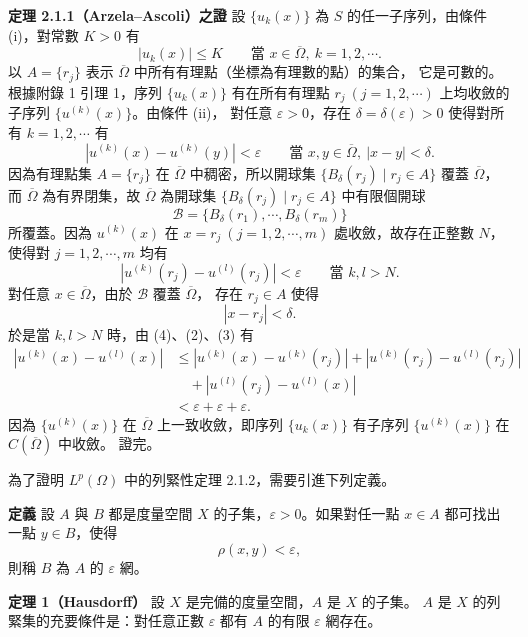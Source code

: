 \documentclass[11pt,a4paper,twoside]{article}
\begin{document}
\noindent\textbf{定理 2.1.1（Arzela--Ascoli）之證}\quad
設 $\{u_k(x)\}$ 為 $S$ 的任一子序列，由條件 (i)，對常數 $K>0$ 有
\[
    |u_k(x)|\le K
    \qquad
    \text{當 }x\in\overline{\Omega},\ k=1,2,\cdots .
    \tag{1}
\]
以 $A=\{r_j\}$ 表示 $\overline{\Omega}$ 中所有有理點（坐標為有理數的點）的集合，
它是可數的。根據附錄 1 引理 1，序列 $\{u_k(x)\}$ 有在所有有理點
$r_j\ (j=1,2,\cdots)$ 上均收斂的子序列 $\{u^{(k)}(x)\}$。由條件 (ii)，
對任意 $\varepsilon>0$，存在 $\delta=\delta(\varepsilon)>0$ 使得對所有
$k=1,2,\cdots$ 有
\[
    |u^{(k)}(x)-u^{(k)}(y)|<\varepsilon
    \qquad
    \text{當 }x,y\in\overline{\Omega},\ |x-y|<\delta .
    \tag{2}
\]
因為有理點集 $A=\{r_j\}$ 在 $\overline{\Omega}$ 中稠密，所以開球集
$\{B_\delta(r_j)\mid r_j\in A\}$ 覆蓋 $\overline{\Omega}$，而
$\overline{\Omega}$ 為有界閉集，故 $\overline{\Omega}$ 為開球集
$\{B_\delta(r_j)\mid r_j\in A\}$ 中有限個開球
\[
    \mathscr{B}=\{B_\delta(r_1),\cdots,B_\delta(r_m)\}
\]
所覆蓋。因為 $u^{(k)}(x)$ 在 $x=r_j\ (j=1,2,\cdots,m)$ 處收斂，故存在正整數
$N$，使得對 $j=1,2,\cdots,m$ 均有
\[
    |u^{(k)}(r_j)-u^{(l)}(r_j)|<\varepsilon
    \qquad
    \text{當 }k,l>N.
    \tag{3}
\]
對任意 $x\in\overline{\Omega}$，由於 $\mathscr{B}$ 覆蓋 $\overline{\Omega}$，
存在 $r_j\in A$ 使得
\[
    |x-r_j|<\delta .
    \tag{4}
\]
於是當 $k,l>N$ 時，由 (4)、(2)、(3) 有
\[
    \begin{aligned}
        |u^{(k)}(x)-u^{(l)}(x)|
         & \le
        |u^{(k)}(x)-u^{(k)}(r_j)|
        +
        |u^{(k)}(r_j)-u^{(l)}(r_j)|              \\
         & \quad+
        |u^{(l)}(r_j)-u^{(l)}(x)|                \\
         & <\varepsilon+\varepsilon+\varepsilon.
    \end{aligned}
\]
因為 $\{u^{(k)}(x)\}$ 在 $\overline{\Omega}$ 上一致收斂，即序列
$\{u_k(x)\}$ 有子序列 $\{u^{(k)}(x)\}$ 在 $C(\overline{\Omega})$ 中收斂。
證完。

\newpage

為了證明 $L^p(\Omega)$ 中的列緊性定理 2.1.2，需要引進下列定義。

\noindent\textbf{定義}\quad
設 $A$ 與 $B$ 都是度量空間 $X$ 的子集，$\varepsilon>0$。如果對任一點
$x\in A$ 都可找出一點 $y\in B$，使得
\[
    \rho(x,y)<\varepsilon,
\]
則稱 $B$ 為 $A$ 的 $\varepsilon$ 網。

\noindent\textbf{定理 1（Hausdorff）}\quad
設 $X$ 是完備的度量空間，$A$ 是 $X$ 的子集。
$A$ 是 $X$ 的列緊集的充要條件是：對任意正數 $\varepsilon$ 都有
$A$ 的有限 $\varepsilon$ 網存在。
\end{document}

